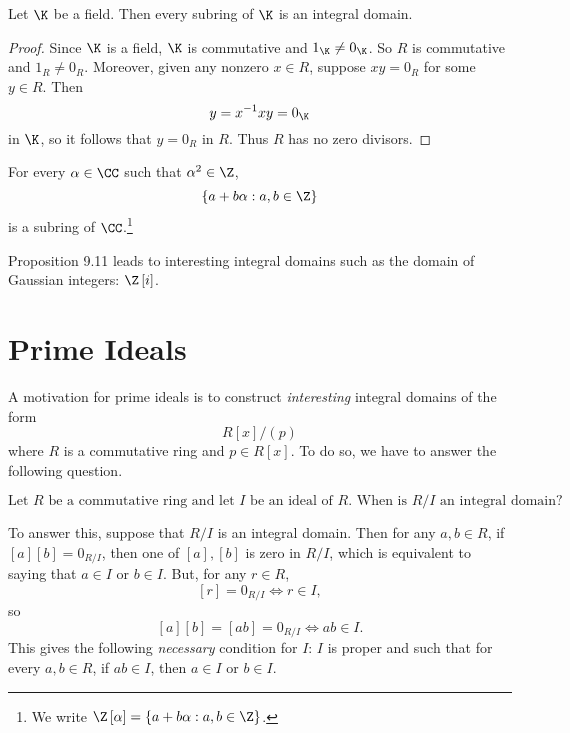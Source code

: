 \documentclass[pmath347]{subfiles}
\begin{document}
    \begin{prop}{}
        Let $\K$ be a field. Then every subring of $\K$ is an integral domain.
    \end{prop}

    \begin{proof}
        Since $\K$ is a field, $\K$ is commutative and $1_{\K}\neq 0_{\K}$. So $R$ is commutative and $1_R\neq 0_R$. Moreover, given any nonzero $x\in R$, suppose $xy=0_R$ for some $y\in R$. Then
        \begin{equation*}
            y = x^{-1} xy = 0_{\K}
        \end{equation*}
        in $\K$, so it follows that $y=0_R$ in $R$. Thus $R$ has no zero divisors.
    \end{proof}

    \begin{prop}{}
        For every $\alpha\in\CC$ such that $\alpha^{2} \in\Z$,
        \begin{equation*}
            \left\lbrace a+b\alpha:a,b\in \Z \right\rbrace 
        \end{equation*}
        is a subring of $\CC$.\footnote{We write $\Z\left[ \alpha \right] = \left\lbrace a+b\alpha:a,b\in\Z \right\rbrace$.}
    \end{prop}

    \np Proposition 9.11 leads to interesting integral domains such as the domain of Gaussian integers: $\Z\left[ i \right]$.

    \section{Prime Ideals}

    \np A motivation for prime ideals is to construct \textit{interesting} integral domains of the form
    \begin{equation*}
        R\left[ x \right] / \left( p \right) 
    \end{equation*}
    where $R$ is a commutative ring and $p\in R\left[ x \right]$. To do so, we have to answer the following question.
    \begin{eqbox}[]
        \begin{equation*}
            \text{Let $R$ be a commutative ring and let $I$ be an ideal of $R$. When is $R /I$ an integral domain?}
        \end{equation*}
    \end{eqbox} 
    To answer this, suppose that $R /I$ is an integral domain. Then for any $a,b\in R$, if $\left[ a \right] \left[ b \right] = 0_{R /I}$, then one of $\left[ a \right] , \left[ b \right]$ is zero in $R /I$, which is equivalent to saying that $a\in I$ or $b\in I$. But, for any $r\in R$,
    \begin{equation*}
        \left[ r \right] = 0_{R /I} \iff r\in I,
    \end{equation*}
    so
    \begin{equation*}
        \left[ a \right]\left[ b \right] = \left[ ab \right]  = 0_{R /I} \iff ab\in I.
    \end{equation*}
    This gives the following \textit{necessary} condition for $I$: $I$ is proper and such that for every $a,b\in R$, if $ab\in I$, then $a\in I$ or $b\in I$.
\end{document}

